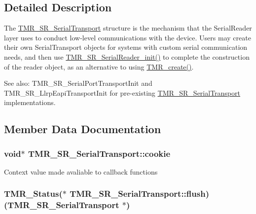 \subsection{Detailed Description}
The \hyperlink{struct_t_m_r___s_r___serial_transport}{TMR\_\-SR\_\-SerialTransport} structure is the mechanism that the SerialReader layer uses to conduct low-level communications with the device. Users may create their own SerialTransport objects for systems with custom serial communication needs, and then use \hyperlink{serial__reader_8c_9dd1d68fa5b7ad34bec0631f4c5a1007}{TMR\_\-SR\_\-SerialReader\_\-init()} to complete the construction of the reader object, as an alternative to using \hyperlink{group__reader_g77b9edd8d948ab1e1d9b95bf546cc43e}{TMR\_\-create()}.

\begin{Desc}
\item[See also:]TMR\_\-SR\_\-SerialPortTransportInit and TMR\_\-SR\_\-LlrpEapiTransportInit for pre-existing \hyperlink{struct_t_m_r___s_r___serial_transport}{TMR\_\-SR\_\-SerialTransport} implementations. \end{Desc}


\subsection{Member Data Documentation}
\hypertarget{struct_t_m_r___s_r___serial_transport_754fb99a45265def1f13043bf0d05420}{
\subsubsection[{cookie}]{\setlength{\rightskip}{0pt plus 5cm}void$\ast$ {\bf TMR\_\-SR\_\-SerialTransport::cookie}}}
\label{struct_t_m_r___s_r___serial_transport_754fb99a45265def1f13043bf0d05420}


Context value made avaliable to callback functions \hypertarget{struct_t_m_r___s_r___serial_transport_967a2ce35f57a99c0630adabd8b54a4e}{
\subsubsection[{flush}]{\setlength{\rightskip}{0pt plus 5cm}TMR\_\-Status($\ast$ {\bf TMR\_\-SR\_\-SerialTransport::flush})({\bf TMR\_\-SR\_\-SerialTransport} $\ast$)}}
\label{struct_t_m_r___s_r___serial_transport_967a2ce35f57a99c0630adabd8b54a4e}


